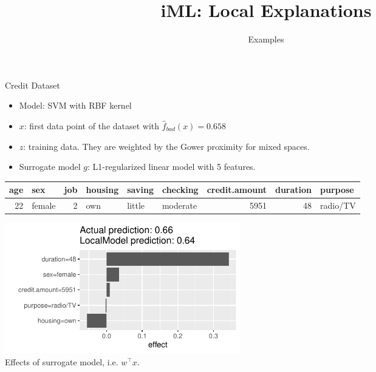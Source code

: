 \documentclass[aspectratio=169]{../latex_main/tntbeamer}  %
\title[Introduction]{iML: Local Explanations}
\subtitle{Examples}
\begin{document}
	
	\maketitle


\begin{frame}{Credit Dataset}

\vspace{-1.5em}
	\begin{itemize}
		\item Model: SVM with RBF kernel
		\item $x$: first data point of the dataset with $\hat{f}_{bad}(x) = 0.658$
		\item $z$: training data. They are weighted by the Gower proximity for mixed spaces. 
		\item Surrogate model $g$: L1-regularized linear model with 5 features. 
	\end{itemize}
	\begin{table}[ht]
		\centering
		\scriptsize
		\begin{tabular}{rlrlllrrl}
			\hline
			age & sex & job & housing & saving & checking & credit.amount & duration & purpose \\ 
			\hline
			 22 & female &   2 & own & little & moderate & 5951 &  48 & radio/TV \\ 
			\hline
		\end{tabular}
	\end{table}
\begin{center}
	\includegraphics[width=0.45\textwidth]{figure/lime_credit.pdf}\\[-0.4em]
	Effects of surrogate model, i.e. $w^\top x$.
\end{center}

\end{frame}
\end{document}
